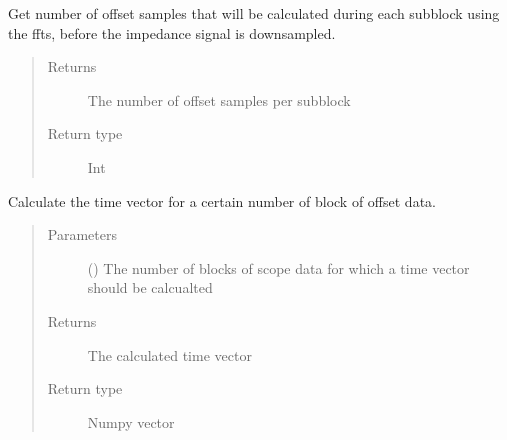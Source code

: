 \documentclass[letterpaper,10pt,english]{sphinxmanual}
\begin{document}
\begin{fulllineitems}
\begin{fulllineitems}
\label{\detokenize{index:TiePieLCR_settings.TiePieLCR_settings.get_offset_sub_block_size}}
\sphinxAtStartPar
Get number of offset samples that will be calculated during each sub\sphinxhyphen{}block using the ffts, before the impedance signal is downsampled.
\begin{quote}\begin{description}
\item[{Returns}] \leavevmode
\sphinxAtStartPar
The number of offset samples per sub\sphinxhyphen{}block

\item[{Return type}] \leavevmode
\sphinxAtStartPar
Int

\end{description}\end{quote}

\end{fulllineitems}


\begin{fulllineitems}
\label{\detokenize{index:TiePieLCR_settings.TiePieLCR_settings.get_offset_time_vector}}
\sphinxAtStartPar
Calculate the time vector for a certain number of block of offset data.
\begin{quote}\begin{description}
\item[{Parameters}] \leavevmode
\sphinxAtStartPar
{} () \textendash{} The number of blocks of scope data for which a time vector should be calcualted

\item[{Returns}] \leavevmode
\sphinxAtStartPar
The calculated time vector

\item[{Return type}] \leavevmode
\sphinxAtStartPar
Numpy vector

\end{description}\end{quote}

\end{fulllineitems}


\end{fulllineitems}
\end{document}
